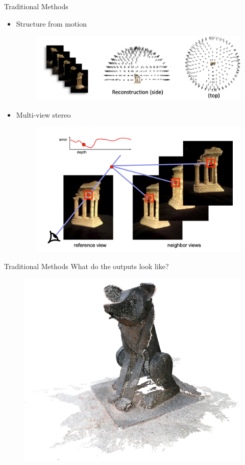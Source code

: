 \documentclass[10pt]{beamer}
\begin{document}
{
\begin{frame}{Traditional Methods}
    \begin{itemize}
        \item Structure from motion
              \begin{figure}
                  \centering
                  \includegraphics[width=0.7\linewidth]{figures/intro/sfm.png}
              \end{figure}
        \item Multi-view stereo
              \begin{figure}
                  \centering
                  \includegraphics[width=0.6\linewidth]{figures/intro/mvs.png}
              \end{figure}
    \end{itemize}
\end{frame}
}


\begin{frame}{Traditional Methods}
    What do the outputs look like?

    \begin{figure}
        \centering
        \includegraphics[width=0.6\linewidth]{figures/intro/point_cloud.png}
    \end{figure}
\end{frame}
\end{document}
